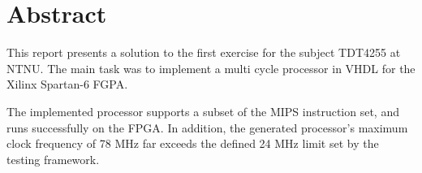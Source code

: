 \section*{Abstract}
\label{sec:abstract}

\vspace*{\fill}
This report presents a solution to the first exercise for the subject TDT4255 at NTNU.
The main task was to implement a multi cycle processor in VHDL for the Xilinx Spartan-6 FGPA.

The implemented processor supports a subset of the MIPS instruction set, and runs successfully on the FPGA.
In addition, the generated processor's maximum clock frequency of 78 MHz
far exceeds the defined 24 MHz limit set by the testing framework.
\vspace*{\fill}
